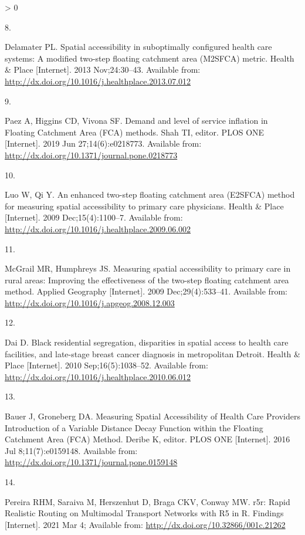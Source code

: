 \documentclass{article}
\newlength{\csllabelwidth}
\newlength{\cslhangindent}
\newenvironment{CSLReferences}[2] %
 {%
  \setlength{\parindent}{0pt}
  \ifodd #1 \everypar{\setlength{\hangindent}{\cslhangindent}}\ignorespaces\fi
  \ifnum #2 > 0
  \setlength{\parskip}{#2\baselineskip}
  \fi
 }%
 {}
\newcommand{\CSLLeftMargin}[1]{\parbox[t]{\csllabelwidth}{#1}}
\newcommand{\CSLRightInline}[1]{\parbox[t]{\linewidth - \csllabelwidth}{#1}\break}
\begin{document}
\begin{CSLReferences}{0}{0}
\leavevmode\hypertarget{ref-delamater2013}{}%
\CSLLeftMargin{8. }
\CSLRightInline{Delamater PL. Spatial accessibility in suboptimally
configured health care systems: A modified two-step floating catchment
area (M2SFCA) metric. Health \& Place {[}Internet{]}. 2013
Nov;24:30--43. Available from:
\url{http://dx.doi.org/10.1016/j.healthplace.2013.07.012}}

\leavevmode\hypertarget{ref-paez2019}{}%
\CSLLeftMargin{9. }
\CSLRightInline{Paez A, Higgins CD, Vivona SF. Demand and level of
service inflation in Floating Catchment Area (FCA) methods. Shah TI,
editor. PLOS ONE {[}Internet{]}. 2019 Jun 27;14(6):e0218773. Available
from: \url{http://dx.doi.org/10.1371/journal.pone.0218773}}

\leavevmode\hypertarget{ref-luo2009}{}%
\CSLLeftMargin{10. }
\CSLRightInline{Luo W, Qi Y. An enhanced two-step floating catchment
area (E2SFCA) method for measuring spatial accessibility to primary care
physicians. Health \& Place {[}Internet{]}. 2009 Dec;15(4):1100--7.
Available from:
\url{http://dx.doi.org/10.1016/j.healthplace.2009.06.002}}

\leavevmode\hypertarget{ref-mcgrail2009}{}%
\CSLLeftMargin{11. }
\CSLRightInline{McGrail MR, Humphreys JS. Measuring spatial
accessibility to primary care in rural areas: Improving the
effectiveness of the two-step floating catchment area method. Applied
Geography {[}Internet{]}. 2009 Dec;29(4):533--41. Available from:
\url{http://dx.doi.org/10.1016/j.apgeog.2008.12.003}}

\leavevmode\hypertarget{ref-dai2010}{}%
\CSLLeftMargin{12. }
\CSLRightInline{Dai D. Black residential segregation, disparities in
spatial access to health care facilities, and late-stage breast cancer
diagnosis in metropolitan Detroit. Health \& Place {[}Internet{]}. 2010
Sep;16(5):1038--52. Available from:
\url{http://dx.doi.org/10.1016/j.healthplace.2010.06.012}}

\leavevmode\hypertarget{ref-bauer2016}{}%
\CSLLeftMargin{13. }
\CSLRightInline{Bauer J, Groneberg DA. Measuring Spatial Accessibility
of Health Care Providers {{}} Introduction of a Variable Distance Decay
Function within the Floating Catchment Area (FCA) Method. Deribe K,
editor. PLOS ONE {[}Internet{]}. 2016 Jul 8;11(7):e0159148. Available
from: \url{http://dx.doi.org/10.1371/journal.pone.0159148}}

\leavevmode\hypertarget{ref-pereira2021}{}%
\CSLLeftMargin{14. }
\CSLRightInline{Pereira RHM, Saraiva M, Herszenhut D, Braga CKV, Conway
MW. r5r: Rapid Realistic Routing on Multimodal Transport Networks with
R5 in R. Findings {[}Internet{]}. 2021 Mar 4; Available from:
\url{http://dx.doi.org/10.32866/001c.21262}}


\end{CSLReferences}
\end{document}
